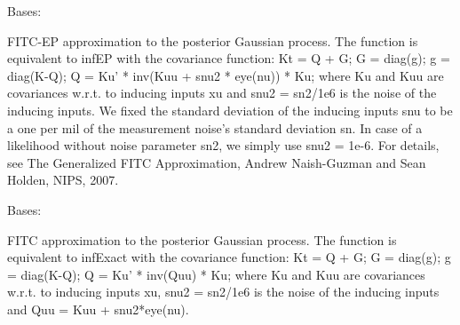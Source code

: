 \documentclass[letterpaper,10pt,english]{sphinxmanual}
\begin{document}
\begin{fulllineitems}
\label{pyGPs.Core:pyGPs.Core.inf.FITC_EP}
Bases: {\hyperref[pyGPs.Core:pyGPs.Core.inf.Inference]{}}

FITC-EP approximation to the posterior Gaussian process. The function is
equivalent to infEP with the covariance function:
Kt = Q + G; G = diag(g); g = diag(K-Q);  Q = Ku' * inv(Kuu + snu2 * eye(nu)) * Ku;
where Ku and Kuu are covariances w.r.t. to inducing inputs xu and
snu2 = sn2/1e6 is the noise of the inducing inputs. We fixed the standard
deviation of the inducing inputs snu to be a one per mil of the measurement 
noise's standard deviation sn. In case of a likelihood without noise
parameter sn2, we simply use snu2 = 1e-6.
For details, see The Generalized FITC Approximation, Andrew Naish-Guzman and
Sean Holden, NIPS, 2007.

\begin{fulllineitems}
\label{pyGPs.Core:pyGPs.Core.inf.FITC_EP.proceed}
\end{fulllineitems}


\end{fulllineitems}


\begin{fulllineitems}
\label{pyGPs.Core:pyGPs.Core.inf.FITC_Exact}
Bases: {\hyperref[pyGPs.Core:pyGPs.Core.inf.Inference]{}}

FITC approximation to the posterior Gaussian process. The function is
equivalent to infExact with the covariance function:
Kt = Q + G; G = diag(g); g = diag(K-Q);  Q = Ku' * inv(Quu) * Ku; 
where Ku and Kuu are covariances w.r.t. to inducing inputs xu, snu2 = sn2/1e6
is the noise of the inducing inputs and Quu = Kuu + snu2*eye(nu).

\begin{fulllineitems}
\label{pyGPs.Core:pyGPs.Core.inf.FITC_Exact.proceed}
\end{fulllineitems}


\end{fulllineitems}
\end{document}

